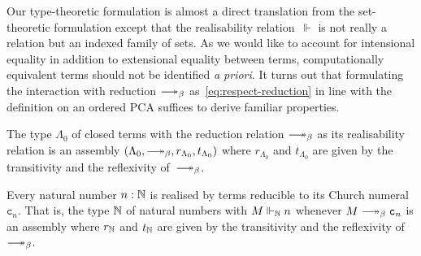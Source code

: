 \documentclass[draft,a4paper,UKenglish,numberwithinsect,cleveref,thm-restate]{lipics-v2021}
\numberwithin{equation}{section}
\theoremstyle{definition}
\theoremstyle{plain}
\begin{document}
Our type-theoretic formulation is almost a direct translation from the set-theoretic formulation except that the realisability relation~$\Vdash$ is not really a relation but an indexed family of sets.
As we would like to account for intensional equality in addition to extensional equality between terms,
computationally equivalent terms should not be identified \emph{a priori}.
It turns out that formulating the interaction with reduction $\reduce$ as~\eqref{eq:respect-reduction} in line with the definition on an ordered PCA suffices to derive familiar properties.

\begin{example}\label{ex:assembly-lambda}
  The type $\Lambda_0$ of closed terms with the reduction relation ${\reduce}$ as its realisability relation is an assembly $(\Lambda_0, \reduce, r_{\Lambda_0}, t_{\Lambda_0})$ where $r_{\Lambda_0}$ and $t_{\Lambda_0}$ are given by the transitivity and the reflexivity of~$\reduce$.
\end{example}

\begin{example} \label{ex:assembly-naturals}
  Every natural number $n : \mathbb{N}$ is realised by terms reducible to its Church numeral~$\mathtt{c}_n$.
  That is, the type $\mathbb{N}$ of natural numbers with $M \Vdash_\mathbb{N} n$ whenever $M \reduce \mathtt{c}_n$ is an assembly where $r_\mathbb{N}$ and $t_\mathbb{N}$ are given by the transitivity and the reflexivity of~$\reduce$.
\end{example}
\end{document}
